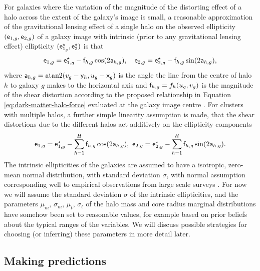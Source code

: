 For galaxies where the variation of the magnitude of the distorting effect of a halo across the extent of the galaxy's image is small, a reasonable approximation of the gravitational lensing effect of a single halo on the observed ellipticity $(\mathsf{e}_{1,g},\mathsf{e}_{2,g})$ of a galaxy image with intrinsic (prior to any gravitational lensing effect) ellipticity $(\mathsf{e}_{1_g}^\star, \mathsf{e}_2^\star)$ is that 
\begin{equation}\label{eq:obs-ellipticity-single-halo}
  \mathsf{e}_{1,g} = \mathsf{e}_{1,g}^\star - \mathsf{f}_{h,g} \cos(2 \mathsf{a}_{h,g}),
  \quad
  \mathsf{e}_{2,g} = \mathsf{e}_{2,g}^\star -  \mathsf{f}_{h,g} \sin(2 \mathsf{a}_{h,g}),
\end{equation}
where $\rvar{a}_{h,g} = \textrm{atan2}\lpa v_g - \rvar{y}_h, u_g - \rvar{x}_g\rpa$ is the angle the line from the centre of halo $h$ to galaxy $g$ makes to the horizontal axis and $\mathsf{f}_{h,g} = f_h(u_g, v_g)$ is the magnitude of the shear distortion according to the proposed relationship in Equation \eqref{eq:dark-matter-halo-force} evaluated at the galaxy image centre \citep{bartelmann2001weak,marshall2003bayesian}. For clusters with multiple halos, a further simple linearity assumption is made, that the shear distortions due to the different halos act additively on the ellipticity components
\begin{equation}\label{eq:obs-ellipticity-multiple-halos}
  \mathsf{e}_{1,g} = \mathsf{e}_{1,g}^\star - \sum_{h=1}^H \mathsf{f}_{h,g} \cos(2 \mathsf{a}_{h,g}),
  ~
  \mathsf{e}_{2,g} = \mathsf{e}_{2,g}^\star -  \sum_{h=1}^H \mathsf{f}_{h,g} \sin(2 \mathsf{a}_{h,g}).
\end{equation}
The intrinsic ellipticities of the galaxies are assumed to have a isotropic, zero-mean normal distribution,  with standard deviation $\sigma$, with normal assumption corresponding well to empirical observations from large scale surveys \citep{bartelmann2001weak,marshall2003bayesian}. For now we will assume the standard deviation $\sigma$ of the intrinsic ellipticities, and the parameters $\mu_m,\,\sigma_m,\,\mu_t,\,\sigma_t$ of the halo mass and core radius marginal distributions have somehow been set to reasonable values, for example based on prior beliefs about the typical ranges of the variables. We will discuss possible strategies for choosing (or inferring) these parameters in more detail later.

\subsection{Making predictions}

